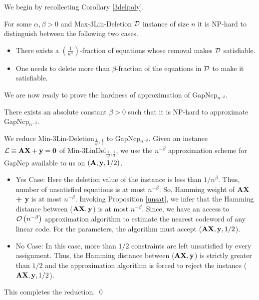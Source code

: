 
We begin by recollecting Corollary \ref{3delpoly}.

\begin{corollary}
  For some $\alpha, \beta > 0$ and {\sc Max-3Lin-Deletion} ${\cal D}$
  instance of size $n$ it is {\sf NP}-hard to distinguish between the
  following two cases.
\begin{itemize}
\item There exists a $\left(\frac{1}{n^\alpha}\right)$-fraction of equations
  whose removal makes ${\cal D}$ satisfiable.
\item One needs to delete more than $\beta$-fraction of the equations
  in ${\cal D}$ to make it satisfiable.
\end{itemize}
\end{corollary}

\noindent We are now ready to prove the hardness of approximation of
{\sc GapNcp}$_{n^{-\beta}}$.

\begin{theorem}
  There exists an absolute constant $\beta > 0$ such that it is {\sf
    NP}-hard to approximate {\sc GapNcp}$_{n^{-\beta}}$.
\end{theorem}
 We reduce {\sc
  Min-3Lin-Deletion}$_{\frac{1}{n^{\beta}}, \frac{1}{2}}$ to {\sc
  {Gap}{Ncp}}$_{n^{-\beta}}$.  Given an instance ${\cal L} \equiv {\bf AX +
  y = 0}$ of {\sc Min-3LinDel}$_{\frac{1}{n^{\beta}}, \frac{1}{2}}$,
we use the $n^{-\beta}$ approximation scheme for {\sc GapNcp}
available to us on $\left({\bf A, y}, 1/2\right)$.
\begin{itemize}
\item {\sf Yes Case:} Here the deletion value of the instance is less
  than $1/n^{\beta}$. Thus, number of unsatisfied equations is at most
  $n^{-\beta}$. So, Hamming weight of {\bf AX + y} is at most $
  n^{-\beta}$. Invoking Proposition \ref{unsat}, we infer that the
  Hamming distance between (${\bf AX, y}$) is at most
  $n^{-\beta}$. Since, we have an access to ${\cal
    O}\left(n^{-\beta}\right)$ approximation algorithm to estimate the
  nearest codeword of any linear code. For the parameters, the
  algorithm must accept (${\bf AX, y}, 1/2$).

\item {\sf No Case:} In this case, more than $1/2$ constraints are
 left unsatisfied by every assignment. Thus, the Hamming distance between
  (${\bf AX, y}$) is strictly greater than $1/2$ and the approximation
  algorithm is forced to reject the instance (${\bf AX, y}, 1/2$).
\end{itemize}
This completes the reduction. \qed













